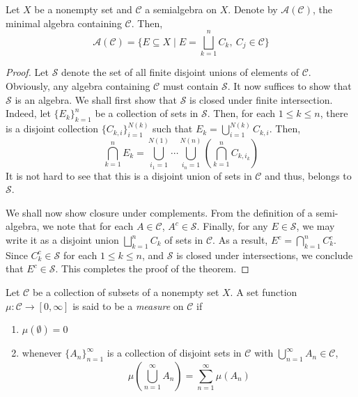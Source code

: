 \begin{proposition}
    Let $X$ be a nonempty set and $\mathscr C$ a semialgebra on $X$. Denote by $\mathcal A(\mathscr C)$, the minimal algebra containing $\mathscr C$. Then, 
    \begin{equation*}
        \mathcal A(\mathscr C) = \{E\subseteq X\mid E = \bigsqcup_{k = 1}^n C_k,~C_j\in\mathscr C\}
    \end{equation*}
\end{proposition}
\begin{proof}
    Let $\mathcal S$ denote the set of all finite disjoint unions of elements of $\mathscr C$. Obviously, any algebra containing $\mathscr C$ must contain $\mathcal S$. It now suffices to show that $\mathscr S$ is an algebra. We shall first show that $\mathcal S$ is closed under finite intersection. Indeed, let $\{E_k\}_{k = 1}^n$ be a collection of sets in $\mathcal S$. Then, for each $1\le k\le n$, there is a disjoint collection $\{C_{k,i}\}_{i = 1}^{N(k)}$ such that $E_k = \bigcup_{i = 1}^{N(k)}C_{k,i}$. Then, 
    \begin{equation*}
        \bigcap_{k = 1}^n E_k = \bigcup_{i_1 = 1}^{N(1)}\cdots\bigcup_{i_n = 1}^{N(n)}\left(\bigcap_{k = 1}^n C_{k,i_k}\right)
    \end{equation*}
    It is not hard to see that this is a disjoint union of sets in $\mathscr C$ and thus, belongs to $\mathcal S$.

    We shall now show closure under complements. From the definition of a semi-algebra, we note that for each $A\in\mathscr C$, $A^c\in\mathcal S$. Finally, for any $E\in\mathcal S$, we may write it as a disjoint union $\bigsqcup\limits_{k = 1}^n C_k$ of sets in $\mathscr C$. As a result, $E^c = \bigcap_{k = 1}^n C_k^c$. Since $C_k^c\in\mathcal S$ for each $1\le k\le n$, and $\mathcal S$ is closed under intersections, we conclude that $E^c\in\mathcal S$. This completes the proof of the theorem.
\end{proof}

\begin{definition}
    Let $\mathcal C$ be a collection of subsets of a nonempty set $X$. A set function $\mu:\mathcal C\to[0,\infty]$ is said to be a \textit{measure} on $\mathcal C$ if 
    \begin{enumerate}[label=(\alph*)]
    \item $\mu(\emptyset) = 0$ 
    \item whenever $\{A_n\}_{n = 1}^\infty$ is a collection of disjoint sets in $\mathcal C$ with $\bigcup\limits_{n = 1}^\infty A_n\in\mathcal C$, 
    \begin{equation*}
        \mu\left(\bigcup_{n = 1}^\infty A_n\right) = \sum_{n = 1}^\infty\mu(A_n)
    \end{equation*}
    \end{enumerate}
\end{definition}

